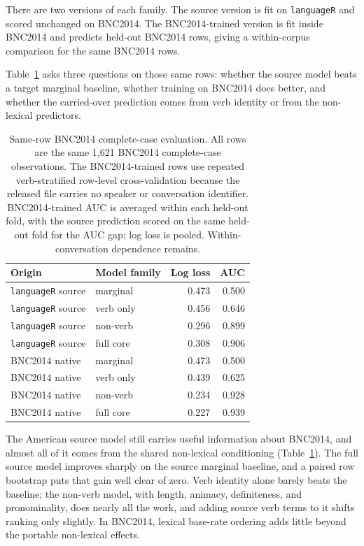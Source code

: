 There are two versions of each family. The source version is fit on
\texttt{languageR} and scored unchanged on BNC2014. The BNC2014-trained version
is fit inside BNC2014 and predicts held-out BNC2014 rows, giving a within-corpus
comparison for the same BNC2014 rows.

Table~\ref{tab:bnc-transport} asks three questions on those same rows: whether
the source model beats a target marginal baseline, whether training on BNC2014
does better, and whether the carried-over prediction comes from verb identity or
from the non-lexical predictors.

\begin{table}[htbp]
\centering
\small
\begin{tabular}{llrr}
\toprule
Origin & Model family & Log loss & AUC \\
\midrule
\texttt{languageR} source & marginal & 0.473 & 0.500 \\
\texttt{languageR} source & verb only & 0.456 & 0.646 \\
\texttt{languageR} source & non-verb & 0.296 & 0.899 \\
\texttt{languageR} source & full core & 0.308 & 0.906 \\
BNC2014 native & marginal & 0.473 & 0.500 \\
BNC2014 native & verb only & 0.439 & 0.625 \\
BNC2014 native & non-verb & 0.234 & 0.928 \\
BNC2014 native & full core & 0.227 & 0.939 \\
\bottomrule
\end{tabular}
\caption{Same-row BNC2014 complete-case evaluation. All rows are the same 1,621
BNC2014 complete-case observations. The BNC2014-trained rows use repeated
verb-stratified row-level cross-validation because the released file carries no
speaker or conversation identifier. BNC2014-trained AUC is averaged within each
held-out fold, with the source prediction scored on the same held-out fold for
the AUC gap; log loss is pooled. Within-conversation dependence remains.}
\label{tab:bnc-transport}
\end{table}

The American source model still carries useful information about BNC2014, and
almost all of it comes from the shared non-lexical conditioning
(Table~\ref{tab:bnc-transport}). The full source model improves sharply on the
source marginal baseline, and a paired row bootstrap puts that gain well clear of
zero. Verb identity alone barely beats the baseline; the non-verb model, with
length, animacy, definiteness, and pronominality, does nearly all the work, and
adding source verb terms to it shifts ranking only slightly. In BNC2014, lexical
base-rate ordering adds little beyond the portable non-lexical effects.

